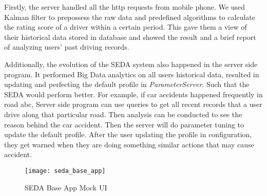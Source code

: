 \documentclass[main.tex]{subfiles}
\begin{document}
Firstly, the server handled all the http requests from mobile phone. We used Kalman filter to prepossess the raw data and predefined algorithms to calculate the rating score of a driver within a certain period. This gave them a view of their historical data stored in database and showed the result and a brief report of analyzing users' past driving records. 

Additionally, the evolution of the SEDA system also happened in the server side program. It performed Big Data analytics on all users historical data, resulted in updating and perfecting the default profile in \emph{ParameterServer}. Such that the SEDA would perform better. For example, if car accidents happened  frequently in road abc, Server side program can use queries to get all recent records that a user drive along that particular road. Then analysis can be conducted to see the reason behind the car accident. Then the server will do parameter tuning to update the default profile. After the user updating the profile in configuration, they get warned when they are doing something similar actions that may cause accident.

\begin{figure}
\caption{SEDA Base App Mock UI}
\centering
\texttt{[image: seda\_base\_app]}
\end{figure}
\end{document}
